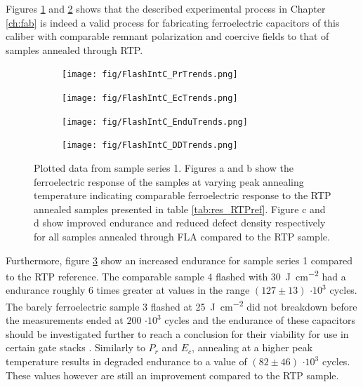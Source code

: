 \documentclass[11pt,twoside]{eitExjobb}
\begin{document}
Figures \ref{fig:res_IntCPr} and \ref{fig:res_IntCEc} shows that the
described experimental process in Chapter \ref{ch:fab} is indeed a valid process for
fabricating ferroelectric capacitors of this caliber with comparable remnant
polarization and coercive fields to that of samples annealed through RTP.

\begin{figure}[htbp]
    \centering
    \begin{subfigure}{.4\linewidth}
        \texttt{[image: fig/FlashIntC\_PrTrends.png]}
        \caption{}\label{fig:res_IntCPr}
    \end{subfigure}
    \begin{subfigure}{.4\linewidth}
        \texttt{[image: fig/FlashIntC\_EcTrends.png]}
        \caption{}\label{fig:res_IntCEc}
    \end{subfigure}
    \begin{subfigure}{.4\linewidth}
        \texttt{[image: fig/FlashIntC\_EnduTrends.png]}
        \caption{}\label{fig:res_IntCEndu}
    \end{subfigure}
    \begin{subfigure}{.4\linewidth}
        \texttt{[image: fig/FlashIntC\_DDTrends.png]}
        \caption{}\label{fig:res_IntCDD}
    \end{subfigure}
    \caption{Plotted data from sample series 1. Figures a and
        b show the ferroelectric response of the samples at varying peak
        annealing temperature indicating comparable ferroelectric response to
        the RTP annealed samples presented in table \ref{tab:res_RTPref}.
        Figure c and d show improved endurance and reduced defect density
        respectively for all samples annealed through FLA compared to the RTP
        sample.}\label{fig:res_IntC}
\end{figure}

Furthermore, figure \ref{fig:res_IntCEndu} show an increased endurance for
sample series 1 compared to the RTP reference. The comparable sample 4 flashed
with \SI{30}{\joule\per\centi\meter\squared} had a endurance roughly 6 times
greater at values in the range $(127 \pm 13)$ $\cdot 10^3$ cycles. The barely
ferroelectric sample 3 flashed at \SI{25}{\joule\per\centi\meter\squared}
did not breakdown before the measurements ended at $200$ $\cdot 10^3$ cycles and
the endurance of these capacitors should be investigated further to reach a
conclusion for their viability for use in certain gate stacks \cite{dawber2005physics}.
Similarly to $P_r$ and $E_c$, annealing at a higher peak temperature results in degraded
endurance to a value of $(82 \pm 46)$ $\cdot 10^3$ cycles. These values however
are still an improvement compared to the RTP sample.
\end{document}
